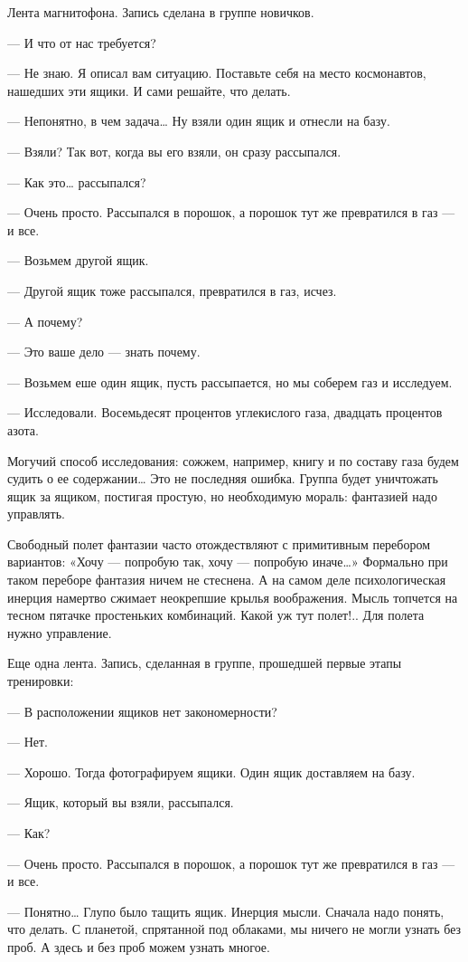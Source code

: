 Лента магнитофона. Запись сделана в группе новичков.

— И что от нас требуется?

— Не знаю.  Я описал вам  ситуацию. Поставьте себя  на место  космонавтов,
нашедших эти ящики. И сами решайте, что делать.

— Непонятно, в чем задача… Ну взяли один ящик и отнесли на базу.

— Взяли? Так вот, когда вы его взяли, он сразу рассыпался.

— Как это… рассыпался?

— Очень просто. Рассыпался в порошок, а порошок тут же превратился в газ —
и все.

— Возьмем другой ящик.

— Другой ящик тоже рассыпался, превратился в газ, исчез.

— А почему?

— Это ваше дело — знать почему.

— Возьмем еше один ящик, пусть рассыпается, но мы соберем газ и исследуем.

— Исследовали. Восемьдесят процентов углекислого газа, двадцать  процентов
азота.

Могучий способ исследования:  сожжем, например,  книгу и  по составу  газа
будем судить  о  ее содержании…  Это  не последняя  ошибка.  Группа  будет
уничтожать ящик  за  ящиком,  постигая  простую,  но  необходимую  мораль:
фантазией надо управлять.

Свободный полет  фантазии  часто  отождествляют  с  примитивным  перебором
вариантов: «Хочу —  попробую так,  хочу — попробую  иначе…» Формально  при
таком переборе фантазия ничем не стеснена. А на самом деле психологическая
инерция намертво сжимает неокрепшие крылья воображения. Мысль топчется  на
тесном пятачке простеньких  комбинаций. Какой уж  тут полет!.. Для  полета
нужно управление.

Еще одна  лента.  Запись,  сделанная  в  группе,  прошедшей  первые  этапы
тренировки:

— В расположении ящиков нет закономерности?

— Нет.

— Хорошо. Тогда фотографируем ящики. Один ящик доставляем на базу.

— Ящик, который вы взяли, рассыпался.

— Как?

— Очень просто. Рассыпался в порошок, а порошок тут же превратился в газ —
и все.

— Понятно… Глупо было тащить ящик. Инерция мысли. Сначала надо понять, что
делать. С планетой, спрятанной под облаками, мы ничего не могли узнать без
проб. А здесь и без проб можем узнать многое.

